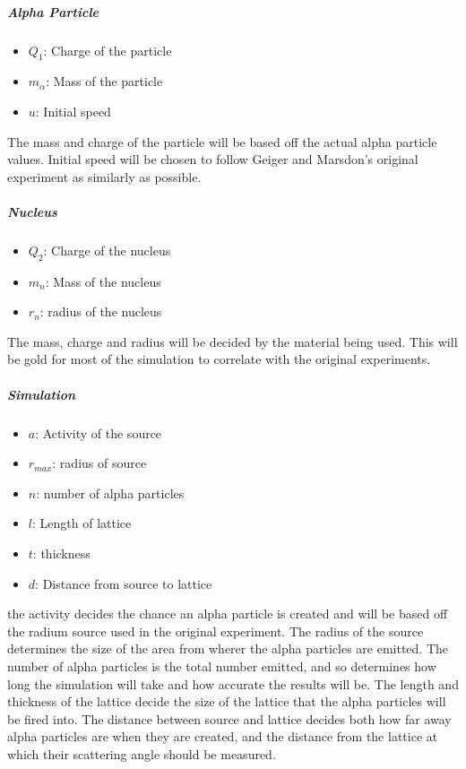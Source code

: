 \documentclass[11pt]{article}
\providecommand{\tightlist}{%
      \setlength{\itemsep}{0pt}\setlength{\parskip}{0pt}}
\begin{document}
\hypertarget{alpha-particle}{%
\subparagraph*{Alpha Particle}\label{alpha-particle}}

\begin{itemize}
\tightlist
\item
  \(Q_{1}\): Charge of the particle
\item
  \(m_{\alpha}\): Mass of the particle
\item
  \(u\): Initial speed
\end{itemize}

The mass and charge of the particle will be based off the actual alpha
particle values. Initial speed will be chosen to follow Geiger and
Marsdon's original experiment as similarly as possible.

\hypertarget{nucleus}{%
\subparagraph*{Nucleus}\label{nucleus}}

\begin{itemize}
\tightlist
\item
  \(Q_{2}\): Charge of the nucleus
\item
  \(m_{n}\): Mass of the nucleus
\item
  \(r_{n}\): radius of the nucleus
\end{itemize}

The mass, charge and radius will be decided by the material being used.
This will be gold for most of the simulation to correlate with the
original experiments.

\hypertarget{simulation}{%
\subparagraph*{Simulation}\label{simulation}}

\begin{itemize}
\tightlist
\item
  \(a\): Activity of the source
\item
  \(r_{max}\): radius of source
\item
  \(n\): number of alpha particles
\item
  \(l\): Length of lattice
\item
  \(t\): thickness
\item
  \(d\): Distance from source to lattice
\end{itemize}

the activity decides the chance an alpha particle is created and will be
based off the radium source used in the original experiment. The radius
of the source determines the size of the area from wherer the alpha
particles are emitted. The number of alpha particles is the total number
emitted, and so determines how long the simulation will take and how
accurate the results will be. The length and thickness of the lattice
decide the size of the lattice that the alpha particles will be fired
into. The distance between source and lattice decides both how far away
alpha particles are when they are created, and the distance from the
lattice at which their scattering angle should be measured.
\end{document}
